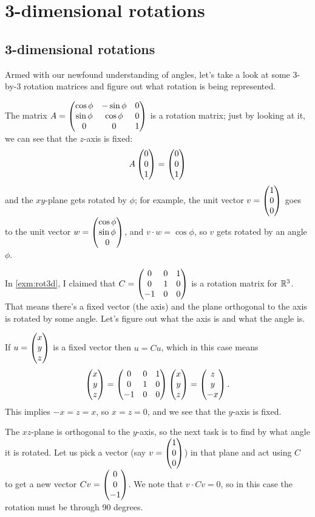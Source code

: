 \documentclass{article}
\begin{document}
\section{3-dimensional rotations}
\subsection{3-dimensional rotations}


Armed with our newfound understanding of angles, let's take a look at
some 3-by-3 rotation matrices and figure out what rotation is being
represented.


\begin{Example}
The matrix \(A=\begin{pmatrix} \cos\phi & -\sin\phi & 0 \\ \sin\phi & \cos\phi &
0 \\ 0 & 0 & 1\end{pmatrix}\) is a rotation matrix; just by looking at it, we
can see that the \(z\)-axis is fixed: \[A\begin{pmatrix} 0 \\ 0 \\ 1\end{pmatrix}=\begin{pmatrix} 0
\\ 0 \\ 1\end{pmatrix}\] and the \(xy\)-plane gets rotated by \(\phi\); for
example, the unit vector \(v=\begin{pmatrix} 1 \\ 0 \\ 0 \end{pmatrix}\) goes to the unit
vector \(w=\begin{pmatrix} \cos\phi \\ \sin\phi \\ 0 \end{pmatrix}\), and \(v\cdot
w=\cos\phi\), so \(v\) gets rotated by an angle \(\phi\).


\end{Example}
\begin{Example}
In \cref{exm:rot3d}, I claimed that \(C=\begin{pmatrix} 0 & 0 & 1 \\ 0 & 1 & 0
\\ -1 & 0 & 0\end{pmatrix}\) is a rotation matrix for \(\mathbb{R}^3\). That means
there's a fixed vector (the axis) and the plane orthogonal to the
axis is rotated by some angle. Let's figure out what the axis is and
what the angle is.


If \(u=\begin{pmatrix} x \\ y\\z\end{pmatrix}\) is a fixed vector then \(u=Cu\), which in
this case means
\[\begin{pmatrix}
x \\y \\ z\end{pmatrix}=\begin{pmatrix} 0 & 0 & 1 \\ 0 & 1 & 0 \\ -1 & 0 & 0 \end{pmatrix}\begin{pmatrix} x \\ y
\\ z\end{pmatrix}=\begin{pmatrix} z \\ y \\ -x\end{pmatrix}.\]
This implies \(-x=z=x\), so \(x=z=0\), and we see that the
\(y\)-axis is fixed.


The \(xz\)-plane is orthogonal to the \(y\)-axis, so the next task
is to find by what angle it is rotated. Let us pick a vector (say
\(v=\begin{pmatrix} 1 \\ 0 \\ 0\end{pmatrix}\)) in that plane and act using \(C\) to get a
new vector \(Cv=\begin{pmatrix} 0 \\ 0 \\ -1\end{pmatrix}\). We note that \(v\cdot Cv=0\),
so in this case the rotation must be through 90 degrees.


\end{Example}
\end{document}
